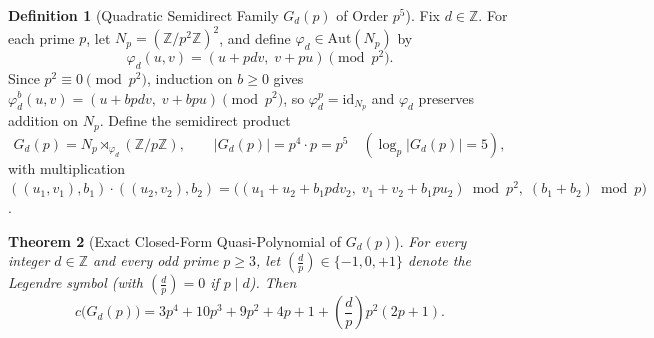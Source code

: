 \documentclass[11pt,a4paper]{article}
\newtheorem{theorem}{Theorem}[section]
\theoremstyle{definition}
\newtheorem{definition}[theorem]{Definition}
\newcommand{\Aut}{\mathrm{Aut}}
\newcommand{\Leg}[2]{\left(\frac{#1}{#2}\right)}
\begin{document}
\begin{definition}[Quadratic Semidirect Family $G_d(p)$ of Order $p^5$]\label{def:Gd}
Fix $d \in \mathbb{Z}$. For each prime $p$, let $N_p = (\mathbb{Z}/p^2\mathbb{Z})^2$, and define $\varphi_d \in \Aut(N_p)$ by
\[
  \varphi_d(u, v) = (u + p d v,\; v + p u) \pmod{p^2}.
\]
Since $p^2 \equiv 0 \pmod{p^2}$, induction on $b \ge 0$ gives $\varphi_d^b(u, v) = (u + b p d v,\; v + b p u) \pmod{p^2}$, so $\varphi_d^p = \mathrm{id}_{N_p}$ and $\varphi_d$ preserves addition on $N_p$. Define the semidirect product
\[
  G_d(p) = N_p \rtimes_{\varphi_d} (\mathbb{Z}/p\mathbb{Z}), \qquad |G_d(p)| = p^4 \cdot p = p^5 \quad (\log_p |G_d(p)| = 5),
\]
with multiplication $((u_1, v_1), b_1) \cdot ((u_2, v_2), b_2) = \bigl((u_1 + u_2 + b_1 p d v_2,\; v_1 + v_2 + b_1 p u_2) \bmod p^2,\; (b_1 + b_2) \bmod p\bigr)$.
\end{definition}

\begin{theorem}[Exact Closed-Form Quasi-Polynomial of $G_d(p)$]\label{thm:Gd-formula}
For every integer $d \in \mathbb{Z}$ and every odd prime $p \ge 3$, let $\Leg{d}{p} \in \{-1, 0, +1\}$ denote the Legendre symbol (with $\Leg{d}{p} = 0$ if $p \mid d$). Then
\begin{equation}\label{eq:Gd}
  c\bigl(G_d(p)\bigr) = 3p^4 + 10p^3 + 9p^2 + 4p + 1 + \Leg{d}{p} p^2(2p + 1).
\end{equation}
\end{theorem}
\end{document}
